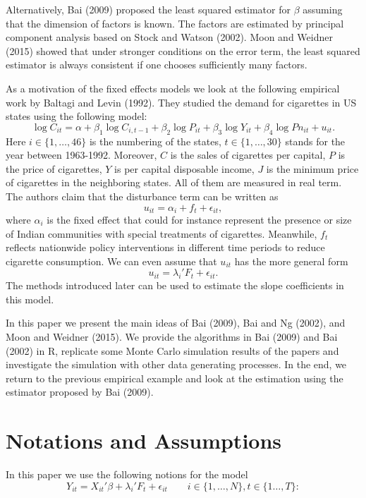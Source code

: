\documentclass[a4paper]{article}
\begin{document}
Alternatively, Bai (2009) proposed the least squared estimator for $\beta$ assuming that the dimension of factors is known. The factors are estimated by principal component analysis based on Stock and Watson (2002). Moon and Weidner (2015) showed that under stronger conditions on the error term, the least squared estimator is always consistent if one chooses sufficiently many factors.

As a motivation of the fixed effects models we look at the following empirical work by Baltagi and Levin (1992). They studied the demand for cigarettes in US states using the following model:
\[
	\log C_{it} =\alpha+\beta_1\log C_{i,t-1}+\beta_2\log P_{it}+\beta_3\log Y_{it}+\beta_4 \log Pn_{it}+u_{it}.
\]
Here $i \in \{1,\ldots, 46\}$ is the numbering of the states, $t \in \{1,\ldots, 30\}$ stands for the year between 1963-1992. Moreover, $C$ is the sales of cigarettes per capital, $P$ is the price of cigarettes, $Y$ is per capital disposable income, $J$ is the minimum price of cigarettes in the neighboring states. All of them are measured in real term. The authors claim that the disturbance term can be written as
\[
	u_{it}=\alpha_i+f_t+\epsilon_{it},
\]
where $\alpha_i$ is the fixed effect that could for instance represent the presence or size of Indian communities with special treatments of cigarettes. Meanwhile, $f_t$ reflects nationwide policy interventions in different time periods to reduce cigarette consumption. We can even assume that $u_{it}$ has the more general form $$u_{it}=\lambda_i'F_t+\epsilon_{it}.$$ The methods introduced later can be used to estimate the slope coefficients in this model.

In this paper we present the main ideas of Bai (2009), Bai and Ng (2002), and Moon and Weidner (2015). We provide the algorithms in Bai (2009) and Bai (2002) in R, replicate some Monte Carlo simulation results of the papers and investigate the simulation with other data generating processes. In the end, we return to the previous empirical example and look at the estimation using the estimator proposed by Bai (2009).

\section{Notations and Assumptions}
In this paper we use the following notions for the model
$$Y_{it}=X_{it}'\beta+\lambda_i'F_t+\epsilon_{it} \qquad i \in \{1,\ldots,N\}, t\in\{1\ldots, T\}:$$
\end{document}
